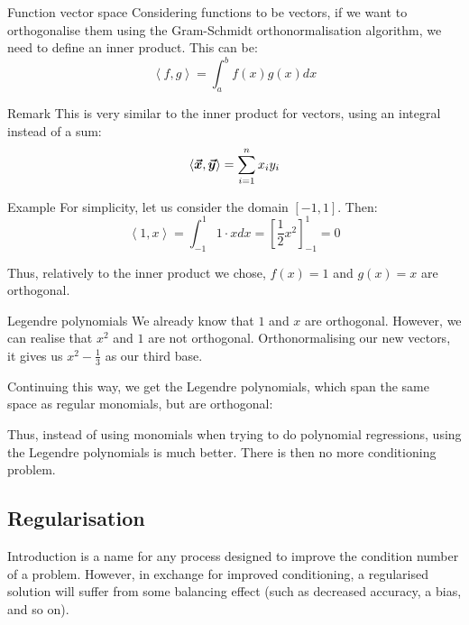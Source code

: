 \documentclass[a4paper]{article}
\begin{document}
\begin{parag}{Function vector space}
    Considering functions to be vectors, if we want to orthogonalise them using the Gram-Schmidt orthonormalisation algorithm, we need to define an inner product. This can be: 
    \[\left\langle f, g \right\rangle = \int_{a}^{b} f\left(x\right)g\left(x\right)dx\]
    
    \begin{subparag}{Remark}
        This is very similar to the inner product for vectors, using an integral instead of a sum:
        \[\left\langle \bvec{x}, \bvec{y} \right\rangle = \sum_{i=1}^{n} x_i y_i\]
    \end{subparag}

    \begin{subparag}{Example}
        For simplicity, let us consider the domain $\left[-1, 1\right]$. Then: 
        \[\left\langle 1, x \right\rangle = \int_{-1}^{1} 1\cdot x dx = \left[\frac{1}{2}x^2\right]_{-1}^1 = 0\]
        
        Thus, relatively to the inner product we chose, $f\left(x\right) = 1$ and $g\left(x\right) = x$ are orthogonal.
    \end{subparag}
\end{parag}

\begin{parag}{Legendre polynomials}
    We already know that $1$ and $x$ are orthogonal. However, we can realise that $x^2$ and $1$ are not orthogonal. Orthonormalising our new vectors, it gives us $x^2 - \frac{1}{3}$ as our third base.

    Continuing this way, we get the Legendre polynomials, which span the same space as regular monomials, but are orthogonal:

    Thus, instead of using monomials when trying to do polynomial regressions, using the Legendre polynomials is much better. There is then no more conditioning problem.
\end{parag}

\subsection{Regularisation}
\begin{parag}{Introduction}
     is a name for any process designed to improve the condition number of a problem. However, in exchange for improved conditioning, a regularised solution will suffer from some balancing effect (such as decreased accuracy, a bias, and so on).
\end{parag}
\end{document}
